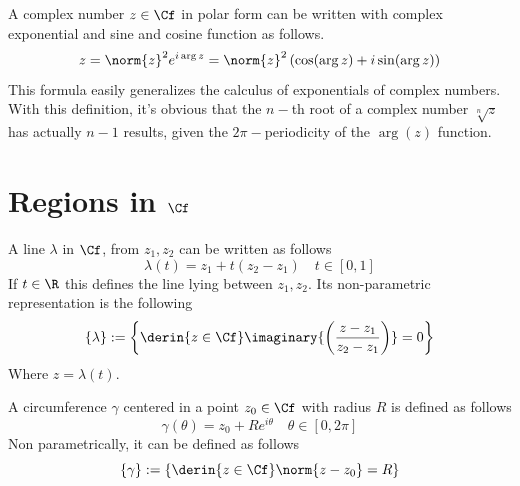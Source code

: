 \documentclass[../mmf.tex]{subfiles}
\begin{document}
\begin{thm}
	A complex number $z\in\Cf$ in polar form can be written with complex exponential and sine and cosine function as follows.
	\begin{equation}
		z=\norm{z}^2e^{i\arg{z}}=\norm{z}^2\left( \cos(\arg{z})+i\sin(\arg{z}) \right)
		\label{eq:demoivreformula}
	\end{equation}
	This formula easily generalizes the calculus of exponentials of complex numbers. With this definition, it's obvious that the $n-$th root of a complex number $\sqrt[n]{z}$ has actually $n-1$ results, given the $2\pi-$periodicity of the $\arg(z)$ function.
\end{thm}
\section{Regions in $\Cf$}
\begin{dfn}[Line]
	A line $\lambda$ in $\Cf$, from $z_1,z_2$ can be written as follows
	\begin{equation}
		\lambda(t)=z_1+t(z_2-z_1)\quad t\in[0,1]
		\label{eq:linecomplex}
	\end{equation}
	If $t\in\R$ this defines the line lying between $z_1,z_2$. Its non-parametric representation is the following
	\begin{equation}
		\{\lambda\}:=\left\{ \derin{z\in\Cf}\imaginary{\left( \frac{z-z_1}{z_2-z_1} \right)}=0 \right\}
		\label{eq:lineinfcompnp}
	\end{equation}
	Where $z=\lambda(t)$.
\end{dfn}
\begin{dfn}[Circumference]
	A circumference $\gamma$ centered in a point $z_0\in\Cf$ with radius $R$ is defined as follows
	\begin{equation}
		\gamma(\theta)=z_0+Re^{i\theta}\quad\theta\in[0,2\pi]
		\label{eq:circparam}
	\end{equation}
	Non parametrically, it can be defined as follows
	\begin{equation}
		\{\gamma\}:=\left\{ \derin{z\in\Cf}\norm{z-z_0}=R \right\}
		\label{eq:circlecomplexnp}
	\end{equation}
\end{dfn}
\end{document}
